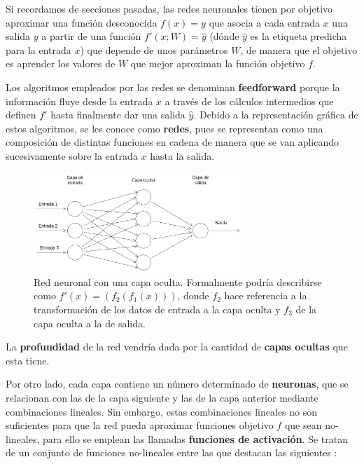             \medskip

            \noindent Si recordamos de secciones pasadas, las redes neuronales tienen por objetivo aproximar una función desconocida $f(x)=y$ que asocia a cada entrada $x$ una salida $y$ a partir de una función $f'(x;W)= \widehat{y}$ (dónde $\widehat{y}$ es la etiqueta predicha para la entrada $x$) que depende de unos parámetros $W$, de manera que el objetivo es aprender los valores de $W$ que mejor aproximan la función objetivo $f$.

            \medskip

            \noindent Los algoritmos empleados por las redes se denominan \textbf{feedforward} porque la información fluye desde la entrada $x$ a través de los cálculos intermedios que definen $f'$ hasta finalmente dar una salida $\widehat{y}$. Debido a la representación gráfica de estos algoritmos, se les conoce como \textbf{redes}, pues se representan como una composición de distintas funciones en cadena de manera que se van aplicando sucesivamente sobre la entrada $x$ hasta la salida.

            \begin{figure}[!h]
                \centering
                \includegraphics[width=0.7\textwidth]{img/single_hidden_layer.png}
                \caption{Red neuronal con una capa oculta. Formalmente podría describirse como $f'(x)=(f_2(f_1(x)))$, donde $f_2$ hace referencia a la transformación de los datos de entrada a la capa oculta y $f_3$ de la capa oculta a la de salida.}
                \label{fig:red_neuronal_capa_oculta}
            \end{figure}

            \noindent La \textbf{profundidad} de la red vendría dada por la cantidad de \textbf{capas ocultas} que esta tiene.

            \medskip

            \noindent Por otro lado, cada capa contiene un número determinado de \textbf{neuronas}, que se relacionan con las de la capa siguiente y las de la capa anterior mediante combinaciones lineales. Sin embargo, estas combinaciones lineales no son suficientes para que la red pueda aproximar funciones objetivo $f$ que sean no-lineales, para ello se emplean las llamadas \textbf{funciones de activación}. Se tratan de un conjunto de funciones no-lineales entre las que destacan las siguientes \cite{sharma2017activation}: 

